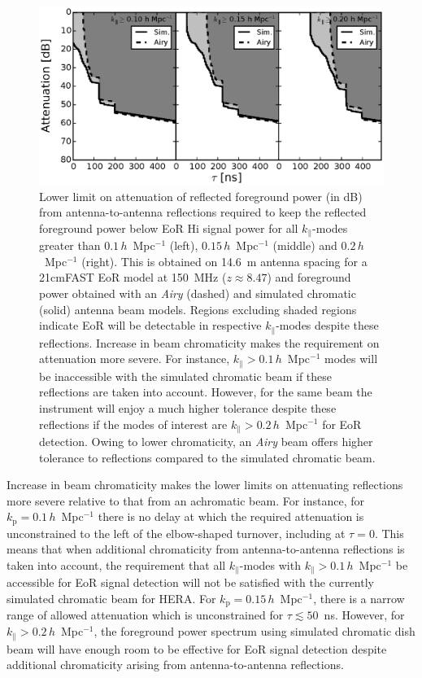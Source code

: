\documentclass[preprint2,iop,numberedappendix,twocolappendix,appendixfloats]{emulateapj}
\begin{document}
\begin{figure}[htb]
\centering
\includegraphics[width=\linewidth]{spec_on_foreground_reflected_power_21cmfast_14.6m_150.0_MHz_subband_v2.eps}
\caption{Lower limit on attenuation of reflected foreground power (in dB) from antenna-to-antenna reflections required to keep the reflected foreground power below EoR H{\sc i} signal power for all $k_\parallel$-modes greater than $0.1\,h$~Mpc$^{-1}$ (left), $0.15\,h$~Mpc$^{-1}$ (middle) and $0.2\,h$~Mpc$^{-1}$ (right). This is obtained on 14.6~m antenna spacing for a 21cmFAST EoR model at 150~MHz ($z\approx 8.47$) and foreground power obtained with an {\it Airy} (dashed) and simulated chromatic (solid) antenna beam models. Regions excluding shaded regions indicate EoR will be detectable in respective $k_\parallel$-modes despite these reflections. Increase in beam chromaticity makes the requirement on attenuation more severe. For instance, $k_\parallel > 0.1\,h$~Mpc$^{-1}$ modes will be inaccessible with the simulated chromatic beam if these reflections are taken into account. However, for the same beam the instrument will enjoy a much higher tolerance despite these reflections if the modes of interest are $k_\parallel > 0.2\,h$~Mpc$^{-1}$ for EoR detection. Owing to lower chromaticity, an {\it Airy} beam offers higher tolerance to reflections compared to the simulated chromatic beam.}
\label{fig:fg-reflections}
\end{figure}

Increase in beam chromaticity makes the lower limits on attenuating reflections more severe relative to that from an achromatic beam. For instance, for $k_\textrm{p}=0.1\,h$~Mpc$^{-1}$ there is no delay at which the required attenuation is unconstrained to the left of the elbow-shaped turnover, including at $\tau=0$. This means that when additional chromaticity from antenna-to-antenna reflections is taken into account, the requirement that all $k_\parallel$-modes with $k_\parallel > 0.1\,h$~Mpc$^{-1}$ be accessible for EoR signal detection will not be satisfied with the currently simulated chromatic beam for HERA. For $k_\textrm{p}=0.15\,h$~Mpc$^{-1}$, there is a narrow range of allowed attenuation which is unconstrained for $\tau \lesssim 50$~ns. However, for $k_\parallel > 0.2\,h$~Mpc$^{-1}$, the foreground power spectrum using simulated chromatic dish beam will have enough room to be effective for EoR signal detection despite additional chromaticity arising from antenna-to-antenna reflections. 
\end{document}
